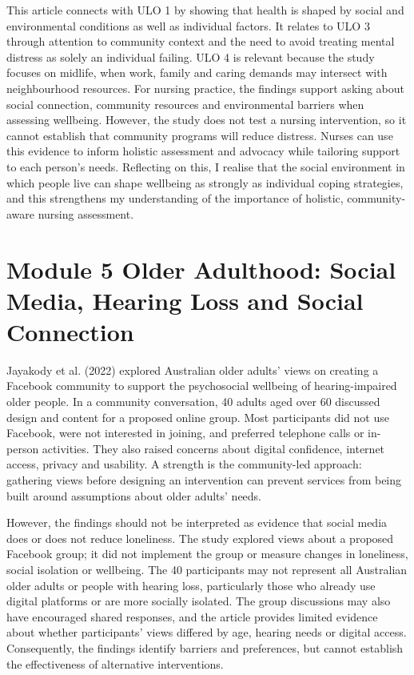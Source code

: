 \documentclass[12pt,a4paper]{article}
\begin{document}
This article connects with ULO 1 by showing that health is shaped by social and environmental conditions as well as individual factors. It relates to ULO 3 through attention to community context and the need to avoid treating mental distress as solely an individual failing. ULO 4 is relevant because the study focuses on midlife, when work, family and caring demands may intersect with neighbourhood resources. For nursing practice, the findings support asking about social connection, community resources and environmental barriers when assessing wellbeing. However, the study does not test a nursing intervention, so it cannot establish that community programs will reduce distress. Nurses can use this evidence to inform holistic assessment and advocacy while tailoring support to each person's needs. Reflecting on this, I realise that the social environment in which people live can shape wellbeing as strongly as individual coping strategies, and this strengthens my understanding of the importance of holistic, community-aware nursing assessment.

\section*{Module 5 Older Adulthood: Social Media, Hearing Loss and Social Connection}

Jayakody et al. (2022) explored Australian older adults' views on creating a Facebook community to support the psychosocial wellbeing of hearing-impaired older people. In a community conversation, 40 adults aged over 60 discussed design and content for a proposed online group. Most participants did not use Facebook, were not interested in joining, and preferred telephone calls or in-person activities. They also raised concerns about digital confidence, internet access, privacy and usability. A strength is the community-led approach: gathering views before designing an intervention can prevent services from being built around assumptions about older adults' needs.

However, the findings should not be interpreted as evidence that social media does or does not reduce loneliness. The study explored views about a proposed Facebook group; it did not implement the group or measure changes in loneliness, social isolation or wellbeing. The 40 participants may not represent all Australian older adults or people with hearing loss, particularly those who already use digital platforms or are more socially isolated. The group discussions may also have encouraged shared responses, and the article provides limited evidence about whether participants' views differed by age, hearing needs or digital access. Consequently, the findings identify barriers and preferences, but cannot establish the effectiveness of alternative interventions.
\end{document}
